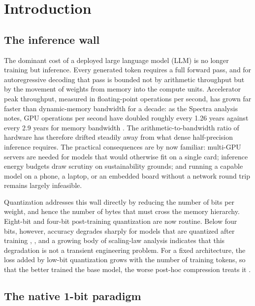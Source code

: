 \documentclass[11pt]{article}
\begin{document}
\section{Introduction}

\subsection{The inference wall}

The dominant cost of a deployed large language model (LLM) is no longer training but
inference. Every generated token requires a full forward pass, and for autoregressive
decoding that pass is bounded not by arithmetic throughput but by the movement of
weights from memory into the compute units. Accelerator peak throughput, measured in
floating-point operations per second, has grown far faster than dynamic-memory bandwidth
for a decade: as the Spectra analysis notes, GPU operations per second have
doubled roughly every 1.26 years against every 2.9 years for memory bandwidth
\cite{Kaushal2024-Spectra}. The arithmetic-to-bandwidth ratio of hardware
has therefore drifted steadily away from what dense half-precision inference requires. The practical
consequences are by now familiar: multi-GPU servers are needed for models that would
otherwise fit on a single card; inference energy budgets draw scrutiny on
sustainability grounds; and running a capable model on a phone, a laptop, or an
embedded board without a network round trip remains largely infeasible.

Quantization addresses this wall directly by reducing the number of bits per weight,
and hence the number of bytes that must cross the memory hierarchy. Eight-bit and
four-bit post-training quantization are now routine. Below four bits, however, accuracy
degrades sharply for models that are quantized after training \cite{Huang2024-BiLLM},
\cite{Shang2023-PBLLM}, and a growing body of scaling-law analysis indicates that this
degradation is not a transient engineering problem. For a fixed architecture, the loss
added by low-bit quantization grows with the number of training tokens, so that the
better trained the base model, the worse post-hoc compression treats it
\cite{Ouyang2024-QiDScaling,Kumar2024-ScalingLawsPrecision}.

\subsection{The native 1-bit paradigm}
\end{document}
